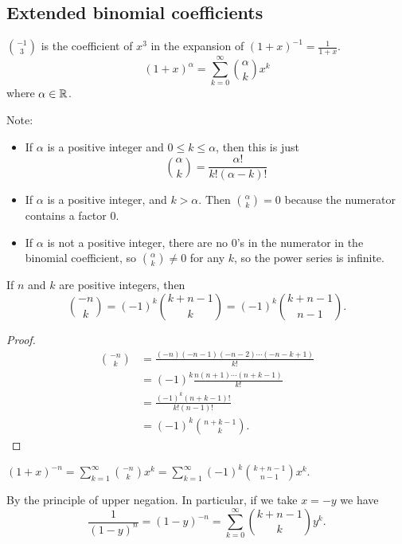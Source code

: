 \documentclass[10pt, a4paper]{article}
\begin{document}
\subsection{Extended binomial coefficients}
$\binom{-1}{3}$ is the coefficient of $x ^ 3$ in the expansion of $(1 + x) ^ {-1} = \frac{1}{1 + x}$.
\[
(1 + x) ^ \alpha = \sum_{k = 0}^{\infty}\binom{\alpha}{k}x ^ k
\]
where $\alpha \in \mathbb{R}$.

Note:
\begin{itemize}
    \item If $\alpha$ is a positive integer and $0 \leq k \leq \alpha$,
    then this is just
    \[
    \binom{\alpha}{k} = \frac{\alpha!}{k!(\alpha - k)!}
    \]
    \item If $\alpha$ is a positive integer,
    and $k > \alpha$.
    Then $\binom{\alpha}{k} = 0$ because the numerator contains a factor $0$.
    \item If $\alpha$ is not a positive integer,
    there are no $0$'s in the numerator in the binomial coefficient, so $\binom{\alpha}{k} \neq 0$ for any $k$, so the power series is infinite.
\end{itemize}

\begin{proposition}
    If $n$ and $k$ are positive integers,
    then
    \[
    \binom{-n}{k} = (-1) ^ k\binom{k + n - 1}{k} = (-1) ^ k\binom{k + n - 1}{n - 1}.
    \]
    \begin{proof}
        \begin{align*}
            \binom{-n}{k} &= \frac{(-n)(-n-1)(-n-2)\dotsi(-n-k+1)}{k!} \\
            &= (-1) ^ k \frac{n(n + 1)\dotsi(n + k - 1)}{k!} \\
            &= \frac{(-1) ^ k(n + k - 1)!}{k!(n - 1)!} \\
            &= (-1) ^ k\binom{n + k - 1}{k}.
        \end{align*}
    \end{proof}
\end{proposition}

\begin{example}
    $(1 + x) ^ {-n} = \sum_{k = 1}^{\infty}\binom{-n}{k}x ^ k = \sum_{k = 1}^{\infty}(-1) ^ k\binom{k + n - 1}{n - 1}x ^ k$.

    By the principle of upper negation.
    In particular,
    if we take $x = -y$ we have
    \[
    \frac{1}{(1 - y) ^ n} = (1 - y) ^ {-n} = \sum_{k = 0}^{\infty}\binom{k + n - 1}{k}y ^ k.
    \]
\end{example}
\end{document}
